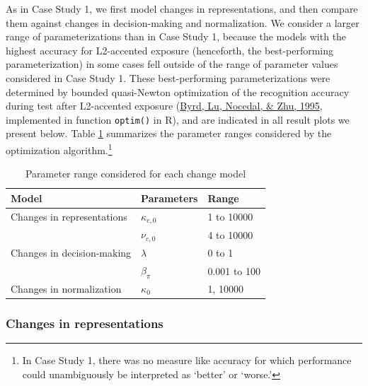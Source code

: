 \documentclass[
  11pt,
  english,
  man,floatsintext]{apa6}
\begin{document}
As in Case Study 1, we first model changes in representations, and then compare them against changes in decision-making and normalization. We consider a larger range of parameterizations than in Case Study 1, because the models with the highest accuracy for L2-accented exposure (henceforth, the best-performing parameterization) in some cases fell outside of the range of parameter values considered in Case Study 1. These best-performing parameterizations were determined by bounded quasi-Newton optimization of the recognition accuracy during test after L2-accented exposure (\protect\hyperlink{ref-byrd1995}{Byrd, Lu, Nocedal, \& Zhu, 1995}, implemented in function \texttt{optim()} in R), and are indicated in all result plots we present below. Table \ref{tab:AA-table-models-parameter-setting} summarizes the parameter ranges considered by the optimization algorithm.\footnote{In Case Study 1, there was no measure like accuracy for which performance could unambiguously be interpreted as `better' or `worse.'}

\begin{table}

\caption{\label{tab:AA-table-models-parameter-setting}Parameter range considered for each change model}
\centering
\begin{tabular}[t]{lll}
\toprule
Model & Parameters & Range\\
\midrule
Changes in representations & $\kappa_{c,0}$ & 1 to 10000\\
\cmidrule{1-3}
 & $\nu_{c,0}$ & 4 to 10000\\
\cmidrule{1-3}
Changes in decision-making & $\lambda$ & 0 to 1\\
\cmidrule{1-3}
 & $\beta_\pi$ & 0.001 to 100\\
\cmidrule{1-3}
Changes in normalization & $\kappa_0$ & 1, 10000\\
\bottomrule
\end{tabular}
\end{table}

\hypertarget{changes-in-representations-1}{%
\subsubsection{Changes in representations}\label{changes-in-representations-1}}
\end{document}
